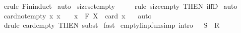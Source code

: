 \begin{isabellebody}
%
\isadelimproof
%
\endisadelimproof
%
\isatagproof
{}\isamarkupfalse%
\ {\isacharparenleft}erule\ Fin{\isacharunderscore}induct{\isacharparenright}\isanewline
{}\isamarkupfalse%
\ auto\isanewline
{}\isamarkupfalse%
%
\endisatagproof
{\isafoldproof}%
%
\isadelimproof
\isanewline
%
\endisadelimproof
\isanewline
\isanewline
{}\isamarkupfalse%
\ size{\isacharunderscore}set{\isacharunderscore}empty{\isacharcolon}\ {\isachardoublequoteopen}{\isacharhash}\ {\isacharbraceleft}{\isacharbraceright}\ {\isacharequal}\ {}{\isachardoublequoteclose}\isanewline
%
\isadelimproof
%
\endisadelimproof
%
\isatagproof
{}\isamarkupfalse%
\ {\isacharparenleft}rule\ size{\isacharunderscore}empty{}\ {\isacharbrackleft}THEN\ iffD{}{\isacharbrackright}{\isacharparenright}\isanewline
{}\isamarkupfalse%
\ auto\isanewline
{}\isamarkupfalse%
%
\endisatagproof
{\isafoldproof}%
%
\isadelimproof
\isanewline
%
\endisadelimproof
\isanewline
\isanewline
{}\isamarkupfalse%
\ card{\isacharunderscore}notempty{\isacharcolon}\ {\isachardoublequoteopen}{\isacharbang}{\isacharbang}x{\isachardot}\ {\isacharbrackleft}{\isacharbar}x\ {\isachartilde}{\isacharequal}\ {\isacharbraceleft}{\isacharbraceright}\ {\isacharsemicolon}\ x\ {\isacharcolon}\ {\isacharpercent}F\ X{\isacharbar}{\isacharbrackright}\ {\isacharequal}{\isacharequal}{\isachargreater}\ card\ x\ {\isachartilde}{\isacharequal}\ {}{\isachardoublequoteclose}\isanewline
%
\isadelimproof
%
\endisadelimproof
%
\isatagproof
{}\isamarkupfalse%
\ auto\isanewline
\isanewline
{}\isamarkupfalse%
\ {\isacharparenleft}drule\ card{\isacharunderscore}empty{}\ {\isacharbrackleft}THEN\ subst{\isacharbrackright}{\isacharparenright}\isanewline
{}\isamarkupfalse%
\ fast{\isacharplus}\isanewline
{}\isamarkupfalse%
%
\endisatagproof
{\isafoldproof}%
%
\isadelimproof
%
\endisadelimproof
%
\isamarkuptrue%
\isamarkupfalse%
\ empty{\isacharunderscore}fin{\isacharunderscore}pfun{\isacharbrackleft}simp{\isacharcomma}\ intro{\isacharbang}{\isacharbrackright}{\isacharcolon}\ {\isachardoublequoteopen}{\isacharbraceleft}{\isacharbraceright}\ {\isacharcolon}\ {\isacharparenleft}S\ {\isacharminus}{\isacharbar}{\isacharbar}{\isacharminus}{\isachargreater}\ R{\isacharparenright}{\isachardoublequoteclose}\isanewline
%
\isadelimproof
%
\endisadelimproof
%
\isatagproof
{}\isamarkupfalse%

\end{isabellebody}

